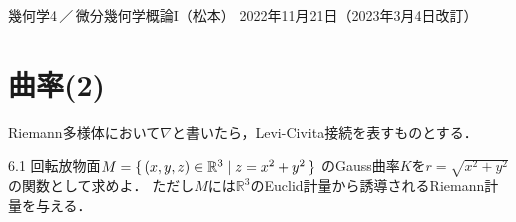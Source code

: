 \documentclass[uplatex,dvipdfmx,fontsize=12pt,jafontsize=11pt,line_length=42zw,number_of_lines=36,hanging_punctuation]{jlreq}
\begin{document}
\begin{flushleft}
	幾何学4\,／\,微分幾何学概論I（松本）
	\hfill
	2022年11月21日（2023年3月4日改訂）
\end{flushleft}
\setcounter{section}{5}
\section{曲率(2)}

Riemann多様体において$\nabla$と書いたら，Levi-Civita接続を表すものとする．

\begin{problems}
	\item[6.1]
		回転放物面$M=\set{(x,y,z)\in\mathbb{R}^3|z=x^2+y^2}$
		のGauss曲率$K$を$r=\sqrt{x^2+y^2}$の関数として求めよ．
		ただし$M$には$\mathbb{R}^3$のEuclid計量から誘導されるRiemann計量を与える．


\end{problems}
\end{document}
